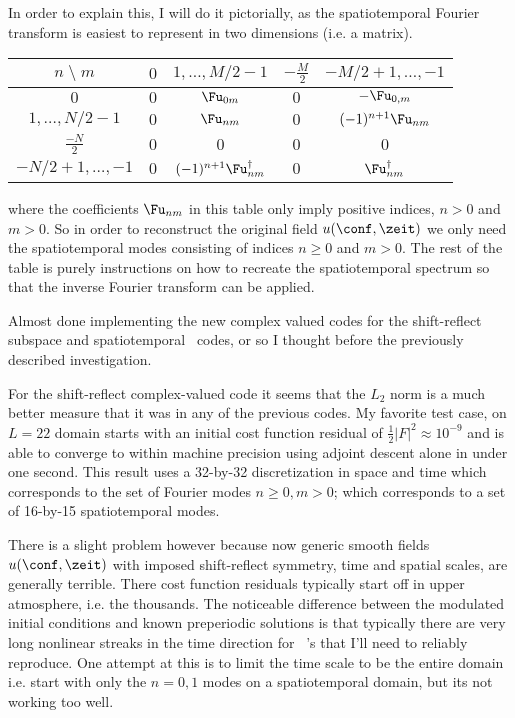 \begin{itemize}
In order to explain this, I will do it pictorially, as the
spatiotemporal Fourier transform is easiest to represent in two
dimensions (i.e. a matrix).

\begin{table}[h!]
\centering
\begin{tabular}{|c|c|c|c|c|}
\hline
\quad  $n\;\setminus\; m$
                  & $0$  & $1,\ldots,M/2-1$                & $-\frac{M}{2}$ & $-M/2+1,\ldots,-1$ \\
\hline
$0$               & $0$  & $\Fu_{0m}$                     & $0$            & $-\Fu_{0,m}$        \\
\hline
$1,\ldots,N/2-1$  & $0$  & $\Fu_{nm}$                     & $0$            & $(-1)^{n+1}\Fu_{nm}$ \\
\hline
$\frac{-N}{2}$    & $0$  & $0$                             & $0$            & $0$                 \\
\hline
$-N/2+1,\ldots,-1$ & $0$  & $(-1)^{n+1}\Fu_{nm}^{\dagger}$ & $0$           & $\Fu_{nm}^{\dagger}$ \\
\hline
\end{tabular}
\end{table}
where the coefficients $\Fu_{nm}$ in this table only imply positive indices, $n>0$ and $m>0$. So in order to
reconstruct the original field $u(\conf,\zeit)$ we only need the spatiotemporal modes consisting of indices $ n \geq 0$
and $m > 0$. The rest of the table is purely instructions on how to recreate the spatiotemporal spectrum so that the
inverse Fourier transform can be applied.

Almost done implementing the new complex valued codes for the shift-reflect
subspace and spatiotemporal \rpo\ codes, or so I thought before the previously
described investigation.

For the shift-reflect complex-valued code it seems that the $L_2$ norm is a much better
measure that it was in any of the previous codes. My favorite test case, 
on $L=22$ domain starts with an initial cost function residual of $\frac{1}{2}|F|^2 \approx 10^{-9}$
and is able to converge to within machine precision using adjoint descent alone in under one second.
This result uses a 32-by-32 discretization in space and time
which corresponds to the set of Fourier modes $n\geq0, m>0$; which corresponds to a set of 16-by-15
spatiotemporal modes.

There is a slight problem however because now generic smooth fields $u(\conf,\zeit)$ with
imposed shift-reflect symmetry, time and spatial scales, are generally terrible. There cost function
residuals typically start off in upper atmosphere, i.e. the thousands. The noticeable difference
between the modulated initial conditions and known preperiodic solutions is that typically there
are very long nonlinear streaks in the time direction for \ppo\ 's that I'll need to reliably
reproduce. One attempt at this is to limit the time scale to be the entire domain i.e. start with only the $n=0,1$ modes on a spatiotemporal domain, but
its not working too well.


\end{itemize}
